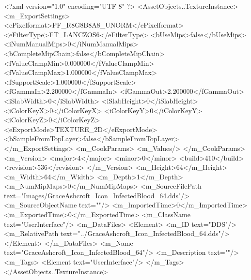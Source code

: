 <?xml version="1.0" encoding="UTF-8" ?>
<AssetObjects..TextureInstance>
	<m_ExportSettings>
		<ePixelformat>PF_R8G8B8A8_UNORM</ePixelformat>
		<eFilterType>FT_LANCZOS6</eFilterType>
		<bUseMips>false</bUseMips>
		<iNumManualMips>0</iNumManualMips>
		<bCompleteMipChain>false</bCompleteMipChain>
		<fValueClampMin>0.000000</fValueClampMin>
		<fValueClampMax>1.000000</fValueClampMax>
		<fSupportScale>1.000000</fSupportScale>
		<fGammaIn>2.200000</fGammaIn>
		<fGammaOut>2.200000</fGammaOut>
		<iSlabWidth>0</iSlabWidth>
		<iSlabHeight>0</iSlabHeight>
		<iColorKeyX>0</iColorKeyX>
		<iColorKeyY>0</iColorKeyY>
		<iColorKeyZ>0</iColorKeyZ>
		<eExportMode>TEXTURE_2D</eExportMode>
		<bSampleFromTopLayer>false</bSampleFromTopLayer>
	</m_ExportSettings>
	<m_CookParams>
		<m_Values/>
	</m_CookParams>
	<m_Version>
		<major>4</major>
		<minor>0</minor>
		<build>410</build>
		<revision>536</revision>
	</m_Version>
	<m_Height>64</m_Height>
	<m_Width>64</m_Width>
	<m_Depth>1</m_Depth>
	<m_NumMipMaps>0</m_NumMipMaps>
	<m_SourceFilePath text="Images/GraceAshcroft_Icon_InfectedBlood_64.dds"/>
	<m_SourceObjectName text=""/>
	<m_ImportedTime>0</m_ImportedTime>
	<m_ExportedTime>0</m_ExportedTime>
	<m_ClassName text="UserInterface"/>
	<m_DataFiles>
		<Element>
			<m_ID text="DDS"/>
			<m_RelativePath text="../GraceAshcroft_Icon_InfectedBlood_64.dds"/>
		</Element>
	</m_DataFiles>
	<m_Name text="GraceAshcroft_Icon_InfectedBlood_64"/>
	<m_Description text=""/>
	<m_Tags>
		<Element text="UserInterface"/>
	</m_Tags>
</AssetObjects..TextureInstance>

